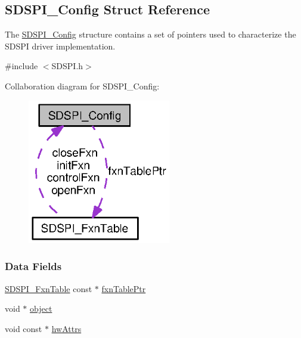 \subsection{S\-D\-S\-P\-I\-\_\-\-Config Struct Reference}
\label{struct_s_d_s_p_i___config}


The \hyperlink{struct_s_d_s_p_i___config}{S\-D\-S\-P\-I\-\_\-\-Config} structure contains a set of pointers used to characterize the S\-D\-S\-P\-I driver implementation.  




{\ttfamily \#include $<$S\-D\-S\-P\-I.\-h$>$}



Collaboration diagram for S\-D\-S\-P\-I\-\_\-\-Config\-:
\nopagebreak
\begin{figure}[H]
\begin{center}
\leavevmode
\includegraphics[width=177pt]{struct_s_d_s_p_i___config__coll__graph}
\end{center}
\end{figure}
\subsubsection*{Data Fields}
\begin{DoxyCompactItemize}
\item 
\hyperlink{struct_s_d_s_p_i___fxn_table}{S\-D\-S\-P\-I\-\_\-\-Fxn\-Table} const $\ast$ \hyperlink{struct_s_d_s_p_i___config_a5e816ddb1d2229f1016b99cba4153be0}{fxn\-Table\-Ptr}
\item 
void $\ast$ \hyperlink{struct_s_d_s_p_i___config_a019c899a3fc8e190998de085e900e5b6}{object}
\item 
void const $\ast$ \hyperlink{struct_s_d_s_p_i___config_a65d8bf130f6e7f1fe0ae550bf52df01f}{hw\-Attrs}
\end{DoxyCompactItemize}


